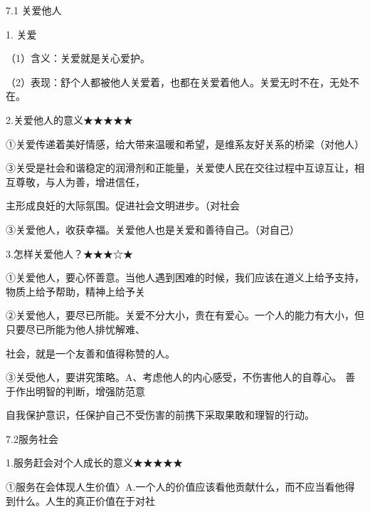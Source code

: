 \documentclass[lang=cn,11pt]{elegantbook}
\newcommand{\daofasym}[1]{{\daofasymbolfont #1}}
\newcommand{\daofasym}[1]{#1}
\begin{document}
7.1 关爱他人\par

1. 关爱\par

（1）含义：关爱就是关心爱护。\par

（2）表现：舒个人都被他人关爱着，也都在关爱着他人。关爱无时不在，无处不在。\par

2.关爱他人的意义\daofasym{★}\daofasym{★}\daofasym{★}\daofasym{★}\daofasym{★}\par

\daofasym{①}关爱传递着美好情感，给大带来温暖和希望，是维系友好关系的桥梁（对他人）\par

\daofasym{③}关受是社会和谐稳定的润滑剂和正能量，关爱使人民在交往过程中互谅互让，相互尊敬，与人为善，增进信任，\par

主形成良妊的大际氛围。促进社会文明进步。（对社会\par

\daofasym{③}关爱他人，收获幸福。关爱他人也是关爱和善待自己。（对自己）\par

3.怎样关爱他人？\daofasym{★}\daofasym{★}\daofasym{★}\daofasym{☆}\daofasym{★}\par

\daofasym{①}关爱他人，要心怀善意。当他人遇到困难的时候，我们应该在道义上给予支持，物质上给予帮助，精神上给予关\par

\daofasym{②}关爱他人，要尽已所能。关爱不分大小，贵在有爱心。一个人的能力有大小，但只要尽已所能为他人排忧解难、\par

社会，就是一个友善和值得称赞的人。\par

\daofasym{③}关受他人，要讲究策略。A、考虑他人的内心感受，不伤害他人的自尊心。 善于作出明智的判断，增强防范意\par

自我保护意识，任保护自己不受伤害的前携下采取果敢和理智的行动。\par

7.2服务社会\par

1.服务赶会对个人成长的意义\daofasym{★}\daofasym{★}\daofasym{★}\daofasym{★}\daofasym{★}\par

\daofasym{①}服务在会体现人生价值〉A.一个人的价值应该看他贡献什么，而不应当看他得到什么。人生的真正价值在于对社\par
\end{document}
